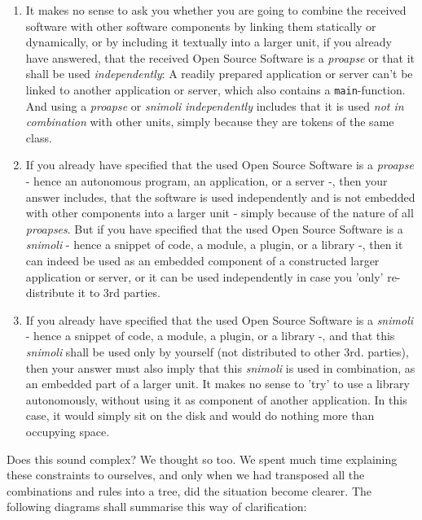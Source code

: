 \begin{enumerate}
  
  \item It makes no sense to ask you
  whether you are going to combine the received software with other software
  components by linking them statically or dynamically, or by including it
  textually into a larger unit, if you already have answered, that the received
  Open Source Software is a \emph{proapse} or that it shall be used
  \emph{independently}: A readily prepared application or server can't be linked
  to another application or server, which also contains a
  \texttt{main}-function. And using a \emph{proapse} or \emph{snimoli}
  \emph{independently} includes that it is used \emph{not in combination} with
  other units, simply because they are tokens of the same class.
  
  \item If you already have specified that the used Open Source Software is a
  \emph{proapse} - hence an autonomous program, an application, or a server -,
  then your answer includes, that the software is used independently and is not
  embedded with other components into a larger unit - simply because of the
  nature of all \emph{proapses}. But if you have specified that the used Open
  Source Software is a \emph{snimoli} - hence a snippet of code, a module, a
  plugin, or a library -, then it can indeed be used as an embedded component of
  a constructed larger application or server, or it can be used independently in
  case you 'only' re-distribute it to 3rd parties.
  
  \item If you already have specified that the used Open Source Software is a
  \emph{snimoli} - hence a snippet of code, a module, a plugin, or a library -,
  and that this \emph{snimoli} shall be used only by yourself (not distributed
  to other 3rd. parties), then your answer must also imply that this
  \emph{snimoli} is used in combination, as an embedded part of a larger unit.
  It makes no sense to 'try' to use a library autonomously, without using it
  as component of another application. In this case, it would simply sit on the
  disk and would do nothing more than occupying space.

\end{enumerate}

Does this sound complex? We thought so too. We spent much
time explaining these constraints to ourselves, and only when we had transposed
all the combinations and rules into a tree, did the situation become clearer.
The following diagrams shall summarise this way of clarification:

%
